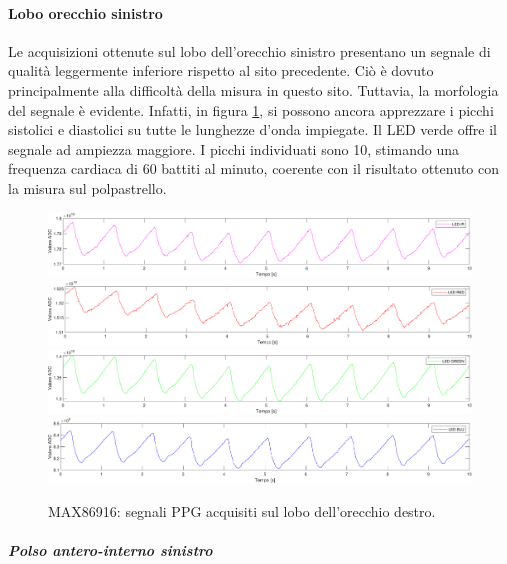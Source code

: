 \clearpage

\paragraph{Lobo orecchio sinistro}
Le acquisizioni ottenute sul lobo dell'orecchio sinistro presentano un segnale di qualità leggermente inferiore rispetto al sito precedente. Ciò è dovuto principalmente alla difficoltà della misura in questo sito. Tuttavia, la morfologia del segnale è evidente. Infatti, in figura \ref{fig:soggetto2_MAX86916_lobo}, si possono ancora apprezzare i picchi sistolici e diastolici su tutte le lunghezze d'onda impiegate. Il LED verde offre il segnale ad ampiezza maggiore. I picchi individuati sono 10, stimando una frequenza cardiaca di 60 battiti al minuto, coerente con il risultato ottenuto con la misura sul polpastrello.
\begin{figure}[h]
	\centering
	\includegraphics[width=1\linewidth]{ImageFiles/Misure Preliminari/Soggetto 2/max86916/lobo_ired}
	\includegraphics[width=1\linewidth]{ImageFiles/Misure Preliminari/Soggetto 2/max86916/lobo_red}
	\includegraphics[width=1\linewidth]{ImageFiles/Misure Preliminari/Soggetto 2/max86916/lobo_green}
	\includegraphics[width=1\linewidth]{ImageFiles/Misure Preliminari/Soggetto 2/max86916/lobo_blu}
	\caption{MAX86916: segnali PPG acquisiti sul lobo dell'orecchio destro.}
	\label{fig:soggetto2_MAX86916_lobo}
\end{figure}

\clearpage

\subparagraph{Polso antero-interno sinistro}

